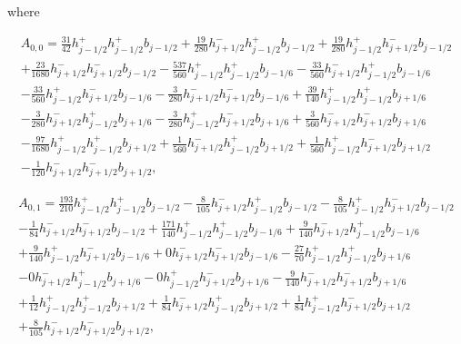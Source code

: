 \documentclass[12pt]{article}
\begin{document}
where

\begin{multline*} A_{0,0} = \frac{31}{42} h_{j-1/2}^+ h_{j-1/2}^+ b_{j-1/2}+\frac{19}{280} h_{j+1/2}^- h_{j-1/2}^+ b_{j-1/2}+\frac{19}{280} h_{j-1/2}^+ h_{j+1/2}^- b_{j-1/2}\\+\frac{23}{1680} h_{j+1/2}^- h_{j+1/2}^- b_{j-1/2}-\frac{537}{560} h_{j-1/2}^+ h_{j-1/2}^+ b_{j-1/6}-\frac{33}{560} h_{j+1/2}^- h_{j-1/2}^+ b_{j-1/6}\\-\frac{33}{560} h_{j-1/2}^+ h_{j+1/2}^- b_{j-1/6}-\frac{3}{280} h_{j+1/2}^- h_{j+1/2}^- b_{j-1/6}+\frac{39}{140} h_{j-1/2}^+ h_{j-1/2}^+ b_{j+1/6}\\-\frac{3}{280} h_{j+1/2}^- h_{j-1/2}^+ b_{j+1/6}-\frac{3}{280} h_{j-1/2}^+ h_{j+1/2}^- b_{j+1/6}+\frac{3}{560} h_{j+1/2}^- h_{j+1/2}^- b_{j+1/6}\\-\frac{97}{1680} h_{j-1/2}^+ h_{j-1/2}^+ b_{j+1/2}+\frac{1}{560} h_{j+1/2}^- h_{j-1/2}^+ b_{j+1/2}+\frac{1}{560} h_{j-1/2}^+ h_{j+1/2}^- b_{j+1/2}\\-\frac{1}{120} h_{j+1/2}^- h_{j+1/2}^- b_{j+1/2}, \end{multline*}

\begin{multline*} A_{0,1} = \frac{193}{210} h_{j-1/2}^+ h_{j-1/2}^+ b_{j-1/2}-\frac{8}{105} h_{j+1/2}^- h_{j-1/2}^+ b_{j-1/2}-\frac{8}{105} h_{j-1/2}^+ h_{j+1/2}^- b_{j-1/2}\\-\frac{1}{84} h_{j+1/2}^- h_{j+1/2}^- b_{j-1/2}+\frac{171}{140} h_{j-1/2}^+ h_{j-1/2}^+ b_{j-1/6}+\frac{9}{140} h_{j+1/2}^- h_{j-1/2}^+ b_{j-1/6}\\+\frac{9}{140} h_{j-1/2}^+ h_{j+1/2}^- b_{j-1/6}+0 h_{j+1/2}^- h_{j+1/2}^- b_{j-1/6}-\frac{27}{70} h_{j-1/2}^+ h_{j-1/2}^+ b_{j+1/6}\\-0 h_{j+1/2}^- h_{j-1/2}^+ b_{j+1/6}-0 h_{j-1/2}^+ h_{j+1/2}^- b_{j+1/6}-\frac{9}{140} h_{j+1/2}^- h_{j+1/2}^- b_{j+1/6}\\+\frac{1}{12} h_{j-1/2}^+ h_{j-1/2}^+ b_{j+1/2}+\frac{1}{84} h_{j+1/2}^- h_{j-1/2}^+ b_{j+1/2}+\frac{1}{84} h_{j-1/2}^+ h_{j+1/2}^- b_{j+1/2}\\+\frac{8}{105} h_{j+1/2}^- h_{j+1/2}^- b_{j+1/2}, \end{multline*}
\end{document}
